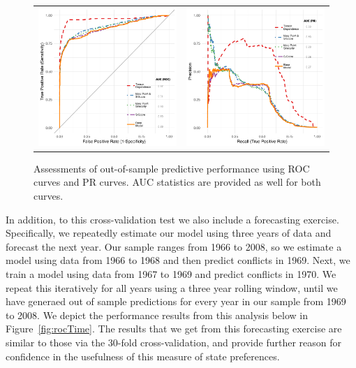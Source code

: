 \documentclass[12pt,pdflatex]{elsarticle}
\begin{document}
\begin{figure}[ht]
	\centering
	\begin{tabular}{cc}
	\includegraphics[width=.4\textwidth]{roc_outSample} &
	\includegraphics[width=.4\textwidth]{rocPr_outSample}
	\end{tabular}
	\caption{Assessments of out-of-sample predictive performance using ROC curves and PR curves. AUC statistics are provided as well for both curves.}
	\label{fig:roc}
\end{figure}
\FloatBarrier

In addition, to this cross-validation test we also include a forecasting exercise. Specifically, we repeatedly estimate our model using three years of data and forecast the next year. Our sample ranges from 1966 to 2008, so we estimate a model using data from 1966 to 1968 and then predict conflicts in 1969. Next, we train a model using data from 1967 to 1969 and predict conflicts in 1970. We repeat this iteratively for all years using a three year rolling window, until we have generaed out of sample predictions for every year in our sample from 1969 to 2008. We depict the performance results from this analysis below in Figure~\ref{fig:rocTime}. The results that we get from this forecasting exercise are similar to those via the 30-fold cross-validation, and provide further reason for confidence in the usefulness of this measure of state preferences.
\end{document}
